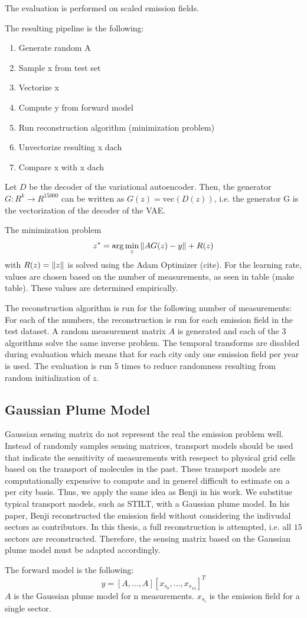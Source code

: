 The evaluation is performed on scaled emission fields.

The resulting pipeline is the following:
\begin{enumerate}
    \item Generate random A
    \item Sample x from test set
    \item Vectorize x
    \item Compute y from forward model
    \item Run reconstruction algorithm (minimization problem)
    \item Unvectorize resulting x dach
    \item Compare x with x dach
\end{enumerate}

Let $D$ be the decoder of the variational autoencoder.
Then, the generator $G: R^k \rightarrow R^{15000}$ can be written as $G(z) = \text{vec}(D(z))$, i.e. the generator G is the vectorization of the decoder of the VAE.

The minimization problem
\begin{equation}
    z^* = \arg\min_{z}{\left\lVert A G(z) - y\right\rVert + R(z)}
\end{equation}
with $R(z) = \left\lVert z\right\rVert$ is solved using the Adam Optimizer (cite).
For the learning rate, values are chosen based on the number of measurements, as seen in table (make table).
These values are determined empirically.

The reconstruction algorithm is run for the following number of measurements:
For each of the numbers, the reconstruction is run for each emission field in the test dataset.
A random measurement matrix $A$ is generated and each of the $3$ algorithms solve the same inverse problem.
The temporal transforms are disabled during evaluation which means that for each city only one emission field per year is used.
The evaluation is run 5 times to reduce randomness resulting from random initialization of $z$.

\subsection{Gaussian Plume Model}
Gaussian sensing matrix do not represent the real the emission problem well.
Instead of randomly samples sensing matrices, transport models should be used that indicate the sensitivity of measurements with resepect to physical grid cells based on the transport of molecules in the past.
These transport models are computationally expensive to compute and in generel difficult to estimate on a per city basis.
Thus, we apply the same idea as Benji in his work.
We substitue typical transport models, such as STILT, with a Gaussian plume model.
In his paper, Benji reconstructed the emission field without considering the indivudal sectors as contributors.
In this thesis, a full reconstruction is attempted, i.e. all $15$ sectors are reconstructed.
Therefore, the sensing matrix based on the Gaussian plume model must be adapted accordingly.

The forward model is the following:
\begin{equation}
    y = [A, \dots, A] [x_{s_0}, \dots, x_{s_{14}}]^T
\end{equation}
$A$ is the Gaussian plume model for n measurements.
$x_{s_i}$ is the emission field for a single sector.

